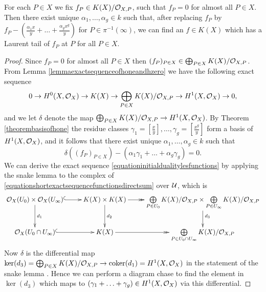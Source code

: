     \begin{cor}
    For each $P \in X$ we fix $f_P \in K(X)/{\cal O}_{X,P}$, such that $f_P = 0$ for almost all $P \in X$.
    Then there exist unique $\alpha_1, \ldots, \alpha_g \in k$ such that, after replacing $f_P$ by $f_P - \left( \frac{\alpha_1 x}{y} + \ldots + \frac{\alpha_g x^g}{y}\right)$ for $P \in \pi^{-1}(\infty)$, we can find an $f \in K(X)$ which has a Laurent tail of $f_P$ at $P$ for all $P \in X$.
    \end{cor}
    \begin{proof}
    Since $f_P = 0$ for almost all $P \in X$ then $(f_P)_{P \in X} \in \bigoplus_{P \in X} K(X)/{\cal O}_{X,P}$.
    From Lemma \ref{lemmaexactsequenceofhoneandhzero} we have the following exact sequence
        \begin{equation*}
        0 \rightarrow H^0(X,{\cal O}_X) \rightarrow K(X) \rightarrow \bigoplus_{P \in X} K(X)/{\cal O}_{X,P} \rightarrow H^1(X,\mathcal{O}_X) \rightarrow 0,
        \end{equation*}
    and we let $\delta$ denote the map $\bigoplus_{P \in X} K(X)/{\cal O}_{X,P} \rightarrow H^1(X,\mathcal{O}_X)$.
    By Theorem \ref{theorembasisofhone} the residue classes $ \gamma_ 1= \left[ \frac{x}{y}\right], \ldots, \gamma_g = \left[\frac{x^g}{y}\right]$ form a basis of $H^1(X,\mathcal{O}_X)$, and it follows that there exist unique $\alpha_1, \ldots, \alpha_g \in k$ such that
        \[
        \delta\left( (f_P)_{P \in X} \right) - \left( \alpha_1\gamma_1 + \ldots + \alpha_g\gamma_g \right) = 0.
        \]
    We can derive the exact sequence \eqref{equationinitialdualitylesfunctions} by applying the snake lemma to the \cech complex of \eqref{equationshortexactsequencefunctionsdirectsum} over ${\mathcal U}$, which is
        \begin{equation*}
        \xymatrix{\cO_X(U_0)\times\cO_X(U_\infty) \ar@{^{(}->}[r] \ar[d]^{d_1} & K(X) \times K(X) \ar[d]^{d_2} \ar@{->>}[r] & \bigoplus \limits_{P \in U_0} K(X)/\cO_{X,P} \times \bigoplus \limits_{P \in U_\infty} K(X)/\cO_{X,P} \ar[d]^{d_3} \\
        \cO_X(U_0 \cap U_\infty) \ar@{^{(}->}[r]  & K(X) \ar@{->>}[r] & \bigoplus \limits_{P\in U_0 \cap U_\infty} K(X)/\cO_{X,P} }
        \end{equation*}
    Now $\delta$ is the differential map $\ker(d_3) = \bigoplus_{P \in X}K(X)/{\cal O}_{X,P} \rightarrow \operatorname{coker}(d_1) = H^1(X,\mathcal{O}_X)$ in the statement of the snake lemma \cite[Lem.\ 1.3.2]{weibel}.
    Hence we can perform a diagram chase to find the element in $\ker(d_3)$ which maps to $\left( \gamma_1 + \ldots + \gamma_g \right) \in H^1(X,\mathcal{O}_X)$ via this differential.

\end{proof}
